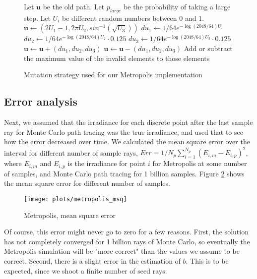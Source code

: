 \documentclass{article} %
\begin{document}
\begin{figure}[h]
\begin{algorithmic}
\STATE Let $\mathbf{u}$ be the old path.
\STATE Let $p_{large}$ be the probability of taking a large step.
\STATE Let $U_i$ be different random numbers between $0$ and $1$. 
    \STATE $\mathbf{u} \gets \left( 2U_1-1, 2\pi U_2, sin^{-1}(\sqrt{U_3})\right)$
\ELSE
    \STATE $du_1 \gets 1/64 e^{-\log(2048/64)U_1}$
    \STATE $du_2 \gets 1/64 e^{-\log(2048/64)U_2}\cdot 0.125$
    \STATE $du_3 \gets 1/64 e^{-\log(2048/64)U_3}\cdot 0.125$
        \STATE $\mathbf{u} \gets \mathbf{u} + (du_1, du_2, du_3)$
    \ELSE
        \STATE $\mathbf{u} \gets \mathbf{u} - (du_1, du_2, du_3)$
    \ENDIF
        \STATE Add or subtract the maximum value of the invalid elements to those elements
    \ENDIF
\ENDIF
\end{algorithmic}
\caption{Mutation strategy used for our Metropolis implementation}
\label{fig:mutation_metropolis}
\end{figure}

\subsection*{Error analysis}
Next, we assumed that the irradiance for each discrete point after the last sample ray for Monte Carlo path tracing was the true irradiance, and used that to see how the error decreased over time. We calculated the mean square error over the interval for different number of sample rays, $Err = 1/N_p \sum_{i=1}^{N_p} (E_{i,m} - E_{i,p})^2$, where $E_{i,m}$ and $E_{i,p}$ is the irradiance for point $i$ for Metropolis at some number of samples, and Monte Carlo path tracing for 1 billion samples. Figure \ref{fig:metropolis_msq} shows the mean square error for different number of samples.

\begin{figure}
    \centering
    \texttt{[image: plots/metropolis\_msq]}\\
    \caption{Metropolis, mean square error}
    \label{fig:metropolis_msq}
\end{figure}

Of course, this error might never go to zero for a few reasons. First, the solution has not completely converged for 1 billion rays of Monte Carlo, so eventually the Metropolis simulation will be "more correct" than the values we assume to be correct. Second, there is a slight error in the estimation of $b$. This is to be expected, since we shoot a finite number of seed rays.
\end{document}
